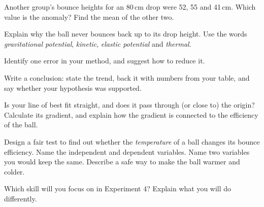 \task Another group's bounce heights for an 80\,cm drop were 52, 55 and 41\,cm. Which value is the anomaly? Find the mean of the other two. 

\task Explain why the ball never bounces back up to its drop height. Use the words \emph{gravitational potential}, \emph{kinetic}, \emph{elastic potential} and \emph{thermal}.

\task Identify one error in your method, and suggest how to reduce it. 

\task Write a conclusion: state the trend, back it with numbers from your table, and say whether your hypothesis was supported.


\begin{yr8box}
\begin{keepext}
\exttask Is your line of best fit straight, and does it pass through (or close to) the origin? Calculate its gradient, and explain how the gradient is connected to the efficiency of the ball.
\end{keepext}
\begin{keepext}
\exttask Design a fair test to find out whether the \emph{temperature} of a ball changes its bounce efficiency.
Name the independent and dependent variables.
Name two variables you would keep the same.
Describe a safe way to make the ball warmer and colder.
\end{keepext}
\end{yr8box}


\begin{skillcheck}
\end{skillcheck}

\task Which skill will you focus on in Experiment 4? Explain what you will do differently.
